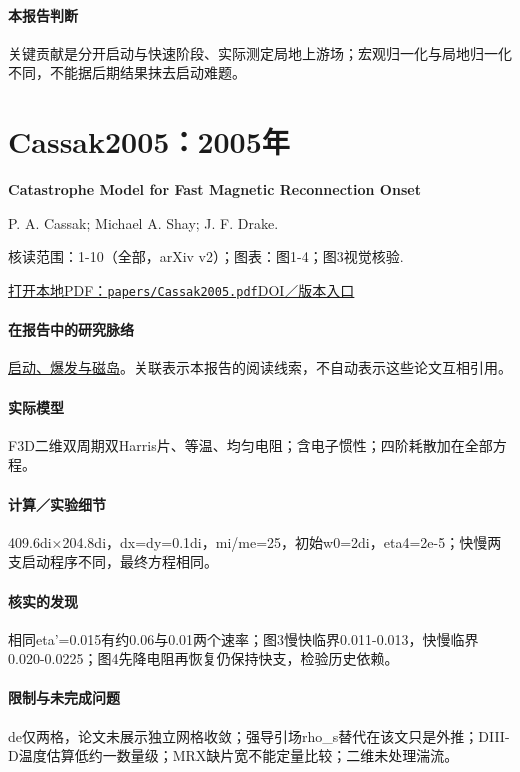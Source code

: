 \paragraph{本报告判断}关键贡献是分开启动与快速阶段、实际测定局地上游场；宏观归一化与局地归一化不同，不能据后期结果抹去启动难题。

\section{Cassak2005：2005年}\label{paper:Cassak2005}

\textbf{Catastrophe Model for Fast Magnetic Reconnection Onset}\citep{Cassak2005}\

P. A. Cassak;  Michael A. Shay;  J. F. Drake.

\textsf{核读范围：}1-10（全部，arXiv v2）；\textsf{图表：}图1-4；图3视觉核验.

\href{run:papers/Cassak2005.pdf}{打开本地PDF：\texttt{papers/Cassak2005.pdf}}\quad\href{https://doi.org/10.1103/physrevlett.95.235002}{DOI／版本入口}

\paragraph{在报告中的研究脉络}\hyperref[story:onset]{启动、爆发与磁岛}。关联表示本报告的阅读线索，不自动表示这些论文互相引用。

\paragraph{实际模型}F3D二维双周期双Harris片、等温、均匀电阻；含电子惯性；四阶耗散加在全部方程。

\paragraph{计算／实验细节}409.6di×204.8di，dx=dy=0.1di，mi/me=25，初始w0=2di，eta4=2e-5；快慢两支启动程序不同，最终方程相同。

\paragraph{核实的发现}相同eta'=0.015有约0.06与0.01两个速率；图3慢快临界0.011-0.013，快慢临界0.020-0.0225；图4先降电阻再恢复仍保持快支，检验历史依赖。

\paragraph{限制与未完成问题}de仅两格，论文未展示独立网格收敛；强导引场rho\_s替代在该文只是外推；DIII-D温度估算低约一数量级；MRX缺片宽不能定量比较；二维未处理湍流。

